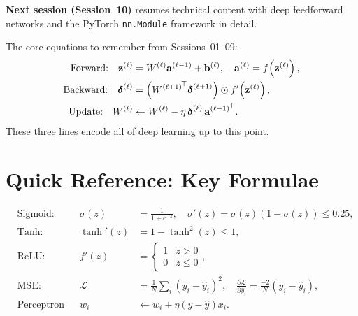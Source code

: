 \documentclass[12pt,a4paper]{article}
\newcommand{\loss}{\mathcal{L}}
\begin{document}
\medskip
\noindent
\textbf{Next session (Session~10)} resumes technical content with deep
feedforward networks and the PyTorch \texttt{nn.Module} framework in
detail.

\begin{keyinsight}
The core equations to remember from Sessions~01--09:
\begin{align}
  \text{Forward:}\quad
  \mathbf{z}^{(\ell)} &= W^{(\ell)}\mathbf{a}^{(\ell-1)} + \mathbf{b}^{(\ell)},
  \quad \mathbf{a}^{(\ell)} = f\!\left(\mathbf{z}^{(\ell)}\right), \notag \\
  \text{Backward:}\quad
  \boldsymbol{\delta}^{(\ell)} &=
    \left({W^{(\ell+1)}}^{\!\top}\boldsymbol{\delta}^{(\ell+1)}\right)
    \odot f'\!\left(\mathbf{z}^{(\ell)}\right), \notag \\
  \text{Update:}\quad
  W^{(\ell)} &\leftarrow W^{(\ell)}
    - \eta\,\boldsymbol{\delta}^{(\ell)}\,{\mathbf{a}^{(\ell-1)}}^{\!\top}. \notag
\end{align}
These three lines encode all of deep learning up to this point.
\end{keyinsight}

\appendix
\section{Quick Reference: Key Formulae}
\label{app:formulae}

\begin{align}
  &\text{Sigmoid:} & \sigma(z) &= \frac{1}{1+e^{-z}}, \quad
    \sigma'(z) = \sigma(z)(1-\sigma(z)) \leq 0.25, \label{eq:sig_ref}\\[4pt]
  &\text{Tanh:}    & \tanh'(z) &= 1 - \tanh^2(z) \leq 1, \label{eq:tanh_ref}\\[4pt]
  &\text{ReLU:}    & f'(z) &= \begin{cases}1 & z > 0 \\ 0 & z \leq 0\end{cases},
    \label{eq:relu_ref}\\[4pt]
  &\text{MSE:}     & \loss &= \frac{1}{N}\sum_i (y_i - \hat{y}_i)^2,
    \quad \frac{\partial\loss}{\partial\hat{y}_i} = \frac{-2}{N}(y_i - \hat{y}_i),
    \label{eq:mse_ref}\\[4pt]
  &\text{Perceptron update:} &
    w_i &\leftarrow w_i + \eta(y-\hat{y})x_i. \label{eq:perc_ref}
\end{align}
\end{document}
